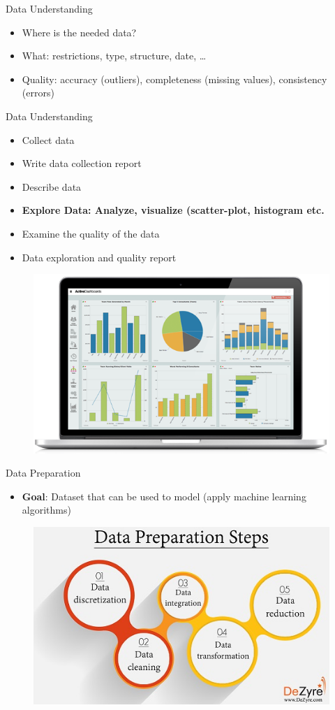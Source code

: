 \documentclass{beamer}
\begin{document}
	\begin{frame}{Data Understanding}
		\begin{itemize}
			\item Where is the needed data?
			\item What: restrictions, type, structure, date, \dots
			\item Quality: accuracy (outliers), completeness (missing values), consistency (errors)
		\end{itemize}
	\end{frame}
	
		\begin{frame}{Data Understanding}
			\begin{itemize}
				\item Collect data
				\item Write data collection report
				\item Describe data
				\item \textbf{Explore Data: Analyze, visualize (scatter-plot, histogram etc.} 
				\item Examine the quality of the data
				\item Data exploration and quality report
			\end{itemize}
            \begin{figure}
            \includegraphics[width = 0.5\linewidth]{figures/introduction/data_understanding}
            \end{figure}
		\end{frame}
	
	\begin{frame}{Data Preparation}
		\begin{itemize}
			\item \textbf{Goal}: Dataset that can be used to model (apply machine learning algorithms)
		\end{itemize}
        \begin{figure}
        \includegraphics[width = .7\linewidth]{figures/introduction/data_prep}
        \end{figure}
	\end{frame}
	
\end{document}

